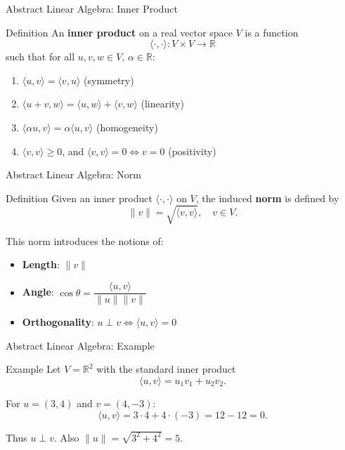 \blueheader
\begin{frame}{Abstract Linear Algebra: Inner Product}
\begin{blue*}{Definition}
An \textbf{inner product} on a real vector space $V$ is a function
\[
\langle \cdot, \cdot \rangle : V \times V \to \mathbb{R}
\]
such that for all $u,v,w \in V$, $\alpha \in \mathbb{R}$:
\begin{enumerate}
    \item $\langle u,v \rangle = \langle v,u \rangle$ \hfill (symmetry)
    \item $\langle u+v,w \rangle = \langle u,w \rangle + \langle v,w \rangle$ \hfill (linearity)
    \item $\langle \alpha u, v \rangle = \alpha \langle u,v \rangle$ \hfill (homogeneity)
    \item $\langle v,v \rangle \ge 0$, and $\langle v,v \rangle = 0 \iff v=0$ \hfill (positivity)
\end{enumerate}
\end{blue*}
\end{frame}

\redheader
\begin{frame}{Abstract Linear Algebra: Norm}
\begin{red*}{Definition}
Given an inner product $\langle \cdot, \cdot \rangle$ on $V$, the induced \textbf{norm} is defined by
\[
\|v\| = \sqrt{\langle v, v \rangle}, \quad v \in V.
\]

This norm introduces the notions of:
\begin{itemize}
    \item \textbf{Length}: $\|v\|$
    \item \textbf{Angle}: $\cos \theta = \dfrac{\langle u, v \rangle}{\|u\|\|v\|}$
    \item \textbf{Orthogonality}: $u \perp v \iff \langle u, v \rangle = 0$
\end{itemize}
\end{red*}
\end{frame}

\greenheader
\begin{frame}{Abstract Linear Algebra: Example}
\begin{green*}{Example}
Let $V = \mathbb{R}^2$ with the standard inner product
\[
\langle u, v \rangle = u_1 v_1 + u_2 v_2.
\]

For $u = (3,4)$ and $v = (4,-3)$:
\[
\langle u, v \rangle = 3 \cdot 4 + 4 \cdot (-3) = 12 - 12 = 0.
\]

Thus $u \perp v$.  
Also $\|u\| = \sqrt{3^2+4^2}=5$.
\end{green*}
\end{frame}

